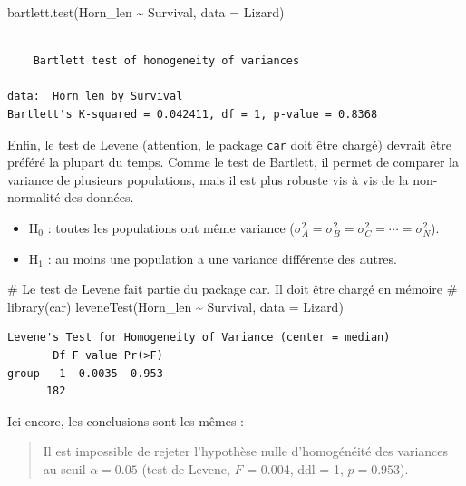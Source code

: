 \documentclass[
  french,
  a4paper,
  DIV=11,
  numbers=noendperiod,
  oneside]{scrreprt}
\newenvironment{Shaded}{}{}
\newcommand{\AttributeTok}[1]{\textcolor[rgb]{0.84,0.23,0.29}{#1}}
\newcommand{\CommentTok}[1]{\textcolor[rgb]{0.42,0.45,0.49}{#1}}
\newcommand{\FunctionTok}[1]{\textcolor[rgb]{0.44,0.26,0.76}{#1}}
\newcommand{\NormalTok}[1]{\textcolor[rgb]{0.14,0.16,0.18}{#1}}
\newcommand{\SpecialCharTok}[1]{\textcolor[rgb]{0.00,0.36,0.77}{#1}}
\providecommand{\tightlist}{%
  \setlength{\itemsep}{0pt}\setlength{\parskip}{0pt}}
\begin{document}
\begin{Shaded}
\begin{Highlighting}[]
\FunctionTok{bartlett.test}\NormalTok{(Horn\_len }\SpecialCharTok{\textasciitilde{}}\NormalTok{ Survival, }\AttributeTok{data =}\NormalTok{ Lizard)}
\end{Highlighting}
\end{Shaded}

\begin{verbatim}

    Bartlett test of homogeneity of variances

data:  Horn_len by Survival
Bartlett's K-squared = 0.042411, df = 1, p-value = 0.8368
\end{verbatim}

Enfin, le test de Levene (attention, le package \texttt{car} doit être
chargé) devrait être préféré la plupart du temps. Comme le test de
Bartlett, il permet de comparer la variance de plusieurs populations,
mais il est plus robuste vis à vis de la non-normalité des données.

\begin{itemize}
\tightlist
\item
  H\(_0\) : toutes les populations ont même variance
  (\(\sigma^2_A = \sigma^2_B = \sigma^2_C = \cdots = \sigma^2_N\)).
\item
  H\(_1\) : au moins une population a une variance différente des
  autres.
\end{itemize}

\begin{Shaded}
\begin{Highlighting}[]
\CommentTok{\# Le test de Levene fait partie du package car. Il doit être chargé en mémoire}
\CommentTok{\# library(car)}
\FunctionTok{leveneTest}\NormalTok{(Horn\_len }\SpecialCharTok{\textasciitilde{}}\NormalTok{ Survival, }\AttributeTok{data =}\NormalTok{ Lizard)}
\end{Highlighting}
\end{Shaded}

\begin{verbatim}
Levene's Test for Homogeneity of Variance (center = median)
       Df F value Pr(>F)
group   1  0.0035  0.953
      182               
\end{verbatim}

Ici encore, les conclusions sont les mêmes :

\begin{quote}
Il est impossible de rejeter l'hypothèse nulle d'homogénéité des
variances au seuil \(\alpha = 0.05\) (test de Levene, \(F\) = 0.004, ddl
= 1, \(p = 0.953\)).
\end{quote}
\end{document}
